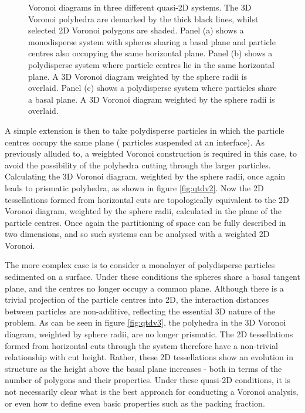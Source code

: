 \begin{figure}[bt]
	
	\caption{Voronoi diagrams in three different quasi\--2D systems. The 3D Voronoi polyhedra are demarked by the thick black lines, whilst selected 2D Voronoi polygons are shaded. Panel (a) shows a monodisperse system with spheres sharing a basal plane and particle centres also occupying the same horizontal plane. Panel (b) shows a polydisperse system where particle centres lie in the same horizontal plane. A 3D Voronoi diagram weighted by the sphere radii is overlaid. Panel (c) shows a polydisperse system where particles share a basal plane. A 3D Voronoi diagram weighted by the sphere radii is overlaid.}
	\label{fig:qtdv}
\end{figure}

A simple extension is then to take polydisperse particles in which the particle centres occupy the same plane (\eg{} particles suspended at an interface).
As previously alluded to, a weighted Voronoi construction is required in this case, to avoid the possibility of the polyhedra cutting through the larger particles.
Calculating the 3D Voronoi diagram, weighted by the sphere radii, once again leads to prismatic polyhedra, as shown in figure \ref{fig:qtdv2}.
Now the 2D tessellations formed from horizontal cuts are topologically equivalent to the 2D Voronoi diagram, weighted by the sphere radii, calculated in the plane of the particle centres.
Once again the partitioning of space can be fully described in two dimensions, and so such systems can be analysed with a weighted 2D Voronoi.

The more complex case is to consider a monolayer of polydisperse particles sedimented on a surface.
Under these conditions the spheres share a basal tangent plane, and the centres no longer occupy a common plane.
Although there is a trivial projection of the particle centres into 2D, the interaction distances between particles are non\--additive, reflecting the essential 3D nature of the problem.
As can be seen in figure \ref{fig:qtdv3}, the polyhedra in the 3D Voronoi diagram, weighted by sphere radii, are no longer prismatic.
The 2D tessellations formed from horizontal cuts through the system therefore have a non\--trivial relationship with cut height.
Rather, these 2D tessellations show an evolution in structure as the height above the basal plane increases - both in terms of the number of polygons and their properties.
Under these quasi\--2D conditions, it is not necessarily clear what is the best approach for conducting a Voronoi analysis, or even how to define even basic properties such as the packing fraction.

